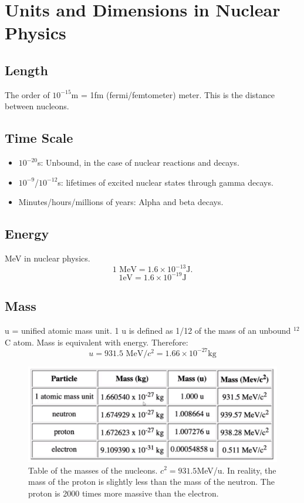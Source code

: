 \documentclass{article}
\begin{document}
\section{Units and Dimensions in Nuclear Physics}
\subsection{Length}
The order of $10^{-15}$m = 1fm (fermi/femtometer) meter. This is the distance between nucleons.

\subsection{Time Scale}
\begin{itemize}
    \item $10^{-20}$s: Unbound, in the case of nuclear reactions and decays. 
    \item $10^{-9}$/$10^{-12}$s: lifetimes of excited nuclear states through gamma decays. 
    \item Minutes/hours/millions of years: Alpha and beta decays. 
\end{itemize}

\subsection{Energy}
MeV in nuclear physics. 
\begin{equation}
    1 \text{ MeV} = 1.6 \times 10^{-13} \text{J}. 
    \end{equation}
    \begin{equation}
        1 \text{eV} = 1.6 \times 10^{-19} \text{J}
        \end{equation}

\subsection{Mass}
u = unified atomic mass unit. 1 u is defined as 1/12 of the mass of an unbound $^{12}$C atom. Mass is equivalent with energy. Therefore:
\begin{equation}
u = 931.5 \text{ MeV} / c^2 = 1.66 \times 10^{-27} \text{kg}
\end{equation}
\begin{figure}[ht!]
    \centering
    \includegraphics[width = \textwidth]{nucleon_mass_table.png}
    \caption{Table of the masses of the nucleons. $c^2 = 931.5$MeV/u. In reality, the mass of the proton is slightly less than the mass of the neutron. The proton is 2000 times more massive than the electron.}
    \label{fig: }
\end{figure}
\end{document}
